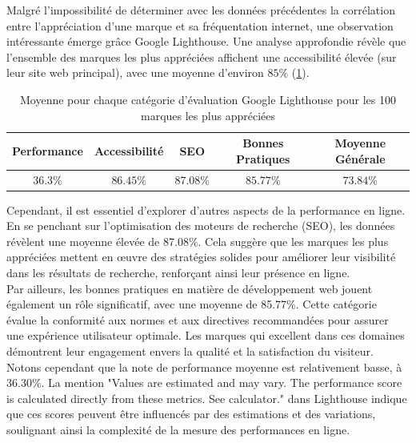\documentclass[12pt, a4paper]{report}
\begin{document}
Malgré l'impossibilité de déterminer avec les données précédentes la corrélation entre l'appréciation d'une marque et sa fréquentation internet, une observation intéressante émerge grâce Google Lighthouse. Une analyse approfondie révèle que l'ensemble des marques les plus appréciées affichent une accessibilité élevée (sur leur site web principal), avec une moyenne d'environ $85\%$ (\ref{tab:table_avg}).\\

\begin{table}[H]
    \centering
    \begin{tabular}{|c|c|c|c|c|}
        \hline
        Performance & Accessibilité & SEO & Bonnes Pratiques & Moyenne Générale\\
        \hline
        $36.3\%$ & $86.45\%$ & $87.08\%$ & $85.77\%$ & $73.84\%$ \\
        \hline
    \end{tabular}
    \caption{Moyenne pour chaque catégorie d'évaluation Google Lighthouse pour les 100 marques les plus appréciées}
    \label{tab:table_avg}
\end{table}

Cependant, il est essentiel d'explorer d'autres aspects de la performance en ligne. En se penchant sur l'optimisation des moteurs de recherche (SEO), les données révèlent une moyenne élevée de 87.08\%. Cela suggère que les marques les plus appréciées mettent en œuvre des stratégies solides pour améliorer leur visibilité dans les résultats de recherche, renforçant ainsi leur présence en ligne.\\

Par ailleurs, les bonnes pratiques en matière de développement web jouent également un rôle significatif, avec une moyenne de 85.77\%. Cette catégorie évalue la conformité aux normes et aux directives recommandées pour assurer une expérience utilisateur optimale. Les marques qui excellent dans ces domaines démontrent leur engagement envers la qualité et la satisfaction du visiteur.\\

Notons cependant que la note de performance moyenne est relativement basse, à 36.30\%. La mention "Values are estimated and may vary. The performance score is calculated directly from these metrics. See calculator." dans Lighthouse indique que ces scores peuvent être influencés par des estimations et des variations, soulignant ainsi la complexité de la mesure des performances en ligne.\\
\end{document}
